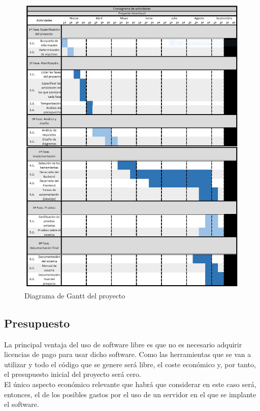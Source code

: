 \begin{figure}[H] 
\centering 
\includegraphics[scale=0.2]{../images/d_gantt.jpg}
\caption{Diagrama de Gantt del proyecto}
\end{figure}

\subsection{Presupuesto}

La principal ventaja del uso de software libre es que no es necesario adquirir licencias de pago para usar dicho software. Como las herramientas que se van a utilizar y todo el código que se genere será libre, el coste económico y, por tanto, el presupuesto inicial del proyecto será cero.\\

El único aspecto económico relevante que habrá que considerar en este caso será, entonces, el de los posibles gastos por el uso de un servidor en el que se implante el software.

